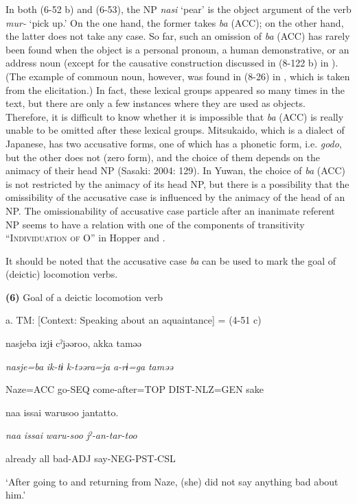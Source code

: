 In both (6-52 b) and (6-53), the NP \textit{nasi} ‘pear’ is the object argument of the verb \textit{mur-} ‘pick up.’ On the one hand, the former takes \textit{ba} (ACC); on the other hand, the latter does not take any case. So far, such an omission of \textit{ba} (ACC) has rarely been found when the object is a personal pronoun, a human demonstrative, or an address noun (except for the causative construction discussed in (8-122 b) in ). (The example of commoun noun, however, was found in (8-26) in , which is taken from the elicitation.) In fact, these lexical groups appeared so many times in the text, but there are only a few instances where they are used as objects. Therefore, it is difficult to know whether it is impossible that \textit{ba} (ACC) is really unable to be omitted after these lexical groups. Mitsukaido, which is a dialect of Japanese, has two accusative forms, one of which has a phonetic form, i.e. \textit{godo}, but the other does not (zero form), and the choice of them depends on the animacy of their head NP (Sasaki: 2004: 129). In Yuwan, the choice of \textit{ba} (ACC) is not restricted by the animacy of its head NP, but there is a possibility that the omissibility of the accusative case is influenced by the animacy of the head of an NP. The omissionability of accusative case particle after an inanimate referent NP seems to have a relation with one of the components of transitivity “I\textsc{ndividuation} \textsc{of} O” in Hopper and \citet[252]{Thompson1980}.

It should be noted that the accusative case \textit{ba} can be used to mark the goal of (deictic) locomotion verbs.

\textbf{(6)}  Goal of a deictic locomotion verb

  a.  TM:  [Context: Speaking about an aquaintance] = (4-51 c)

      nasjeba  izjɨ  cˀjəəroo,  akka  taməə

      \textit{nasje=ba}  \textit{ik-tɨ}  \textit{k-təəra=ja}  \textit{a-rɨ=ga}  \textit{taməə}

      Naze=ACC  go-SEQ  come-after=TOP  DIST-NLZ=GEN  sake

      naa  issai  warusoo  jantatto.

      \textit{naa}  \textit{issai}  \textit{waru-soo}  \textit{jˀ-an-tar-too}

      already  all  bad-ADJ  say-NEG-PST-CSL

      ‘After going to and returning from Naze, (she) did not say anything bad about him.’

